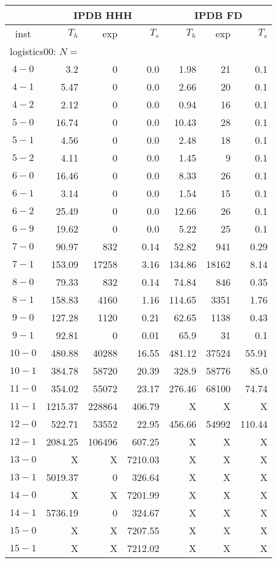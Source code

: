 \begin{longtable}{|c||r|r|r||r|r|r|}\firsthline
& \multicolumn{3}{c||}{IPDB HHH} & \multicolumn{3}{c||}{IPDB FD}\\\hline
inst & $T_h$ & exp & $T_s$ & $T_h$ & exp & $T_s$\\\hline
\multicolumn{7}{|l|}{logistics00: $N=$}\\\hline
$4-0$ & 3.2 & 0 & 0.0 & 1.98 & 21 & 0.1 \\\hline
$4-1$ & 5.47 & 0 & 0.0 & 2.66 & 20 & 0.1 \\\hline
$4-2$ & 2.12 & 0 & 0.0 & 0.94 & 16 & 0.1 \\\hline
$5-0$ & 16.74 & 0 & 0.0 & 10.43 & 28 & 0.1 \\\hline
$5-1$ & 4.56 & 0 & 0.0 & 2.48 & 18 & 0.1 \\\hline
$5-2$ & 4.11 & 0 & 0.0 & 1.45 & 9 & 0.1 \\\hline
$6-0$ & 16.46 & 0 & 0.0 & 8.33 & 26 & 0.1 \\\hline
$6-1$ & 3.14 & 0 & 0.0 & 1.54 & 15 & 0.1 \\\hline
$6-2$ & 25.49 & 0 & 0.0 & 12.66 & 26 & 0.1 \\\hline
$6-9$ & 19.62 & 0 & 0.0 & 5.22 & 25 & 0.1 \\\hline
$7-0$ & 90.97 & 832 & 0.14 & 52.82 & 941 & 0.29 \\\hline
$7-1$ & 153.09 & 17258 & 3.16 & 134.86 & 18162 & 8.14 \\\hline
$8-0$ & 79.33 & 832 & 0.14 & 74.84 & 846 & 0.35 \\\hline
$8-1$ & 158.83 & 4160 & 1.16 & 114.65 & 3351 & 1.76 \\\hline
$9-0$ & 127.28 & 1120 & 0.21 & 62.65 & 1138 & 0.43 \\\hline
$9-1$ & 92.81 & 0 & 0.01 & 65.9 & 31 & 0.1 \\\hline
$10-0$ & 480.88 & 40288 & 16.55 & 481.12 & 37524 & 55.91 \\\hline
$10-1$ & 384.78 & 58720 & 20.39 & 328.9 & 58776 & 85.0 \\\hline
$11-0$ & 354.02 & 55072 & 23.17 & 276.46 & 68100 & 74.74 \\\hline
$11-1$ & 1215.37 & 228864 & 406.79 & X & X & X \\\hline
$12-0$ & 522.71 & 53552 & 22.95 & 456.66 & 54992 & 110.44 \\\hline
$12-1$ & 2084.25 & 106496 & 607.25 & X & X & X \\\hline
$13-0$ & X & X & 7210.03 & X & X & X \\\hline
$13-1$ & 5019.37 & 0 & 326.64 & X & X & X \\\hline
$14-0$ & X & X & 7201.99 & X & X & X \\\hline
$14-1$ & 5736.19 & 0 & 324.67 & X & X & X \\\hline
$15-0$ & X & X & 7207.55 & X & X & X \\\hline
$15-1$ & X & X & 7212.02 & X & X & X \\\hline


\end{longtable}
